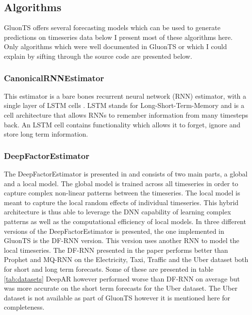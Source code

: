 \subsection{Algorithms}
GluonTS offers several forecasting models which can be used to generate predictions on timeseries data below I present most of these algorithms here. Only algorithms which were well documented in GluonTS \cite{gluonts-website} or which I could explain by sifting through the source code \cite{gluonts-github} are presented below.  

\subsubsection{CanonicalRNNEstimator}
This estimator is a bare bones recurrent neural network (RNN) estimator, with a single layer of LSTM cells \cite{gluonts-github}. LSTM stands for Long-Short-Term-Memory and is a cell architecture that allows RNNs to remember information from many timesteps back. An LSTM cell contains functionality which allows it to forget, ignore and store long term information. \cite{sherstinsky_fundamentals_2020}

\subsubsection{DeepFactorEstimator}
The DeepFactorEstimator is presented in \cite{wang_deep_2019} and consists of two main parts, a global and a local model. The global model is trained across all timeseries in order to capture complex non-linear patterns between the timeseries. The local model is meant to capture the local random effects of individual timeseries. This hybrid architecture is thus able to leverage the DNN capability of learning complex patterns as well as the computational efficiency of local models. In \cite{wang_deep_2019} three different versions of the DeepFactorEstimator is presented, the one implemented in GluonTS is the DF-RNN version. This version uses another RNN to model the local timeseries. The DF-RNN presented in the paper performs better than Prophet and MQ-RNN on the Electricity, Taxi, Traffic and the Uber dataset both for short and long term forecasts. Some of these are presented in table  \ref{tab:datasets} DeepAR however performed worse than DF-RNN on average but was more accurate on the short term forecasts for the Uber dataset. The Uber dataset is not available as part of GluonTS however it is mentioned here for completeness.

